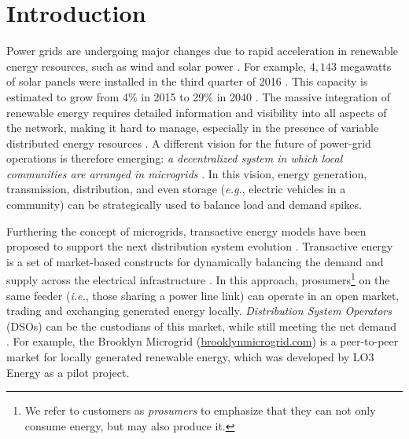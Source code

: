 \section{Introduction}


Power grids are undergoing major changes due to rapid acceleration in
renewable energy resources, such as wind and solar power
\cite{5430489}.
For example, $4,\!143$ megawatts of solar panels were installed in the
third quarter of 2016 \cite{seia}. This capacity is estimated to grow
from 4\% in 2015 to 29\% in 2040 \cite{Randal}. 
The massive integration of renewable energy requires detailed
information and visibility into all aspects of the network, making it
hard to manage, especially in the presence of variable distributed
energy resources \cite{7452738}. A different vision for the future of
power-grid operations is therefore emerging: {\em a decentralized
  system in which local communities are arranged in microgrids}
\cite{rahimi2012transactive}. In this vision, energy generation,
transmission, distribution, and even storage (\emph{e.g.}, electric
vehicles in a community) can be strategically used to balance load and
demand spikes.

Furthering the concept of microgrids, transactive energy models have
been proposed to support the next distribution system evolution
\cite{kok2016society,cox2013structured,melton2013gridwise}. Transactive
energy is a set of market-based constructs for dynamically balancing
the demand and supply across the electrical infrastructure
\cite{melton2013gridwise}. In this approach, prosumers\footnote{We
  refer to customers as \emph{prosumers} to emphasize that they can
  not only consume energy, but may also produce it.} on the same
feeder (\emph{i.e.}, those sharing a power line link) can operate in
an open market, trading and exchanging generated energy
locally. \emph{Distribution System Operators} (DSOs) can be the
custodians of this market, while still meeting the net demand
\cite{7462854}. For example, the Brooklyn Microgrid
(\url{brooklynmicrogrid.com}) is a peer-to-peer market for locally
generated renewable energy, which was developed by LO3 Energy as a pilot project.

